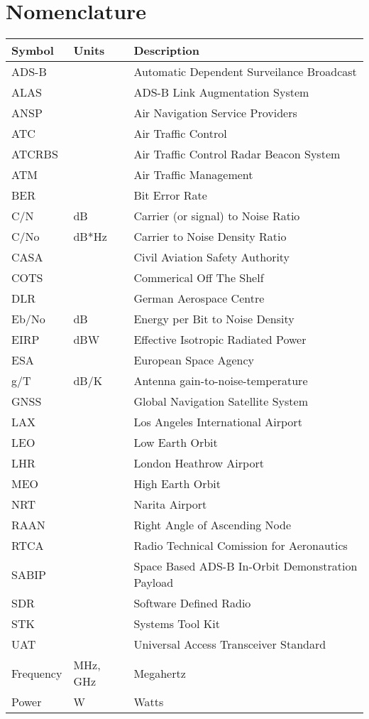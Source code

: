 \section*{Nomenclature}
\renewcommand*{\arraystretch}{1.0}
\begin{longtable}[l]{p{50pt} p{60pt} p{300pt}}
\textbf{Symbol}	& \textbf{Units} & \textbf{Description} \\ \endhead
    ADS-B &       & Automatic Dependent Surveilance Broadcast \\
    ALAS  &       & ADS-B Link Augmentation System \\
    ANSP  &       & Air Navigation Service Providers \\
    ATC   &       & Air Traffic Control \\
    ATCRBS &       & Air Traffic Control Radar Beacon 
System \\
    ATM   &       & Air Traffic Management \\
    BER   &       & Bit Error Rate \\
    C/N   & dB    & Carrier (or signal) to Noise Ratio \\
    C/No  & dB*Hz & Carrier to Noise Density Ratio \\
    CASA  &       & Civil Aviation Safety Authority \\
    COTS  &       & Commerical Off The Shelf \\
    DLR   &       & German Aerospace Centre \\
    Eb/No & dB    & Energy per Bit to Noise Density \\
    EIRP  & dBW   & Effective Isotropic Radiated Power \\
    ESA   &       & European Space Agency \\
    g/T   & dB/K  & Antenna gain-to-noise-temperature \\
    GNSS  &       & Global Navigation Satellite System \\
    LAX   &       & Los Angeles International Airport \\
    LEO   &       & Low Earth Orbit \\
    LHR   &       & London Heathrow Airport \\
    MEO   &       & High Earth Orbit \\
    NRT   &       & Narita Airport \\
    RAAN  &       & Right Angle of Ascending Node \\
    RTCA  &       & Radio Technical Comission for Aeronautics \\
    SABIP &       & Space Based ADS-B In-Orbit Demonstration Payload \\
    SDR   &       & Software Defined Radio \\
    STK   &       & Systems Tool Kit \\
    UAT   &       & Universal Access Transceiver Standard \\
    Frequency & MHz, GHz & Megahertz \\
    Power & W     & Watts \\
 
\end{longtable}
\renewcommand*{\arraystretch}{1.4}

